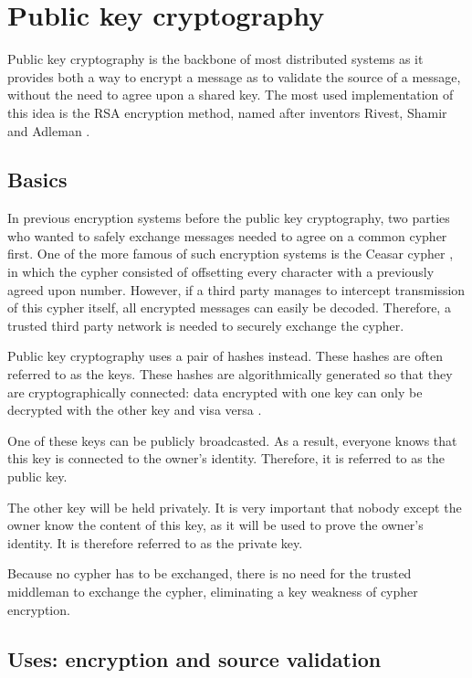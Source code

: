\section{Public key cryptography}

Public key cryptography is the backbone of most distributed systems as it provides both a way to encrypt a message as to validate the source of a message, without the need to agree upon a shared key. The most used implementation of this idea is the RSA encryption method, named after inventors Rivest, Shamir and Adleman \cite{rsa-patent}. 

\subsection{Basics}

In previous encryption systems before the public key cryptography, two parties who wanted to safely exchange messages needed to agree on a common cypher first. One of the more famous of such encryption systems is the Ceasar cypher \cite{ceasar-cypher}, in which the cypher consisted of offsetting every character with a previously agreed upon number. However, if a third party manages to intercept transmission of this cypher itself, all encrypted messages can easily be decoded. Therefore, a trusted third party network is needed to securely exchange the cypher.

Public key cryptography uses a pair of hashes instead. These hashes are often referred to as the keys. These hashes are algorithmically generated so that they are cryptographically connected: data encrypted with one key can only be decrypted with the other key and visa versa \cite{rsa-paper-explanation}.

One of these keys can be publicly broadcasted. As a result, everyone knows that this key is connected to the owner's identity. Therefore, it is referred to as the public key.

The other key will be held privately. It is very important that nobody except the owner know the content of this key, as it will be used to prove the owner's identity. It is therefore referred to as the private key.

Because no cypher has to be exchanged, there is no need for the trusted middleman to exchange the cypher, eliminating a key weakness of cypher encryption.

\subsection{Uses: encryption and source validation}

